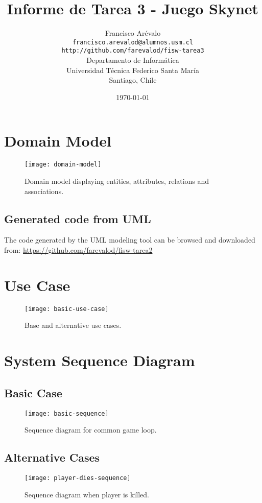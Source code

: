 \documentclass{beamer}
\title{Informe de Tarea 3 - Juego Skynet}
\author{Francisco Ar\'evalo\\
  \texttt{francisco.arevalod@alumnos.usm.cl}\\
  \texttt{http://github.com/farevalod/fisw-tarea3}\\
  \vspace{10mm}
  Departamento de Inform\'atica\\
  Universidad T\'ecnica Federico Santa Mar\'ia\\
  Santiago, Chile}
\date{\today}
\begin{document}
\maketitle
\tableofcontents
\section{Domain Model}
\begin{frame}
\begin{figure}[htb]
\centering
\texttt{[image: domain-model]}
\caption{Domain model displaying entities, attributes, relations and associations.}
\end{figure}
\subsection{Generated code from UML}
The code generated by the UML modeling tool can be browsed and downloaded from: 
\url{https://github.com/farevalod/fisw-tarea2}
\end{frame}
\section{Use Case}
\begin{frame}
\begin{figure}[htb]
\centering
\texttt{[image: basic-use-case]}
\caption{Base and alternative use cases.}
\end{figure}
\end{frame}
\section{System Sequence Diagram}
\begin{frame}
\subsection{Basic Case}
\begin{figure}[htb]
\centering
\texttt{[image: basic-sequence]}
\caption{Sequence diagram for common game loop.}
\end{figure}
\subsection{Alternative Cases}
\begin{figure}[htb]
\centering
\texttt{[image: player-dies-sequence]}
\caption{Sequence diagram when player is killed.}
\end{figure}
\end{frame}
\end{document}
